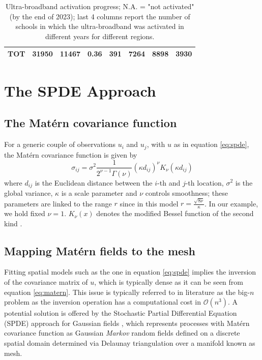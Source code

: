 \documentclass{article}%
\begin{document}
\begin{appendices}
\begin{table}[ht]
{\begin{tabular}{lrrrrrrr}
      \hline
      TOT & 31950 & 11467 & 0.36 & 391 & 7264 & 8898 & 3930 \\ 
       \hline
    \end{tabular}
 }
  \caption{Ultra-broadband activation progress; N.A. = "not activated" (by the end of 2023); last 4 columns report the number of schools in which the ultra-broadband was activated in different years for different regions.  }
  \label{tab:broadband}
 \end{table}





\newpage
\section{The SPDE Approach} \label{Appendix2}

\subsection{The Matérn covariance function} \label{subsection:Matern}
For a generic couple of observations $u_i$ and $u_j$, with $u$ as in equation \ref{eq:spde}, the Matérn covariance function is given by
%
\begin{equation}
\sigma_{ij} =\sigma^2 \frac{1}{2^{\nu-1}\Gamma(\nu)} \left(\kappa  d_{ij}\right)^{\nu}
K_{\nu}(\kappa d_{ij}) 
\label{eq:matern}
\end{equation}
%
where $d_{ij}$ is the Euclidean distance between the $i$-th and $j$-th location, $\sigma^2$ is the global variance,  $\kappa$ is a scale parameter and $\nu$ controls smoothness; these parameters are linked to the range $r$ since in this model $r = \frac{\sqrt{8\nu}}{\kappa}$. In our example, we hold fixed $\nu = 1$. $K_{\nu}(x)$ denotes the modified Bessel function of the second kind \citep[][, Section 9.6]{AS}.
%
\subsection{Mapping Matérn fields to the mesh} \label{subsection:SPDE}
Fitting spatial models such as the one in equation \ref{eq:spde} implies the inversion of the covariance matrix of $u$, which is typically dense as it can be seen from equation \ref{eq:matern}. This issue is typically referred to in literature as the big-$n$ problem \citep{bigN} as the inversion operation has a computational cost in $\mathcal{O}(n^3)$. A potential solution is offered by the Stochastic Partial Differential Equation (SPDE) approach for Gaussian fields \citep{SPDE,SPDE2}, which represents processes with Matérn covariance function as Gaussian \textit{Markov} random fields \citep{GMRFs} defined on a discrete spatial domain determined via Delaunay triangulation over a manifold known as mesh. 


\end{appendices}
\end{document}
